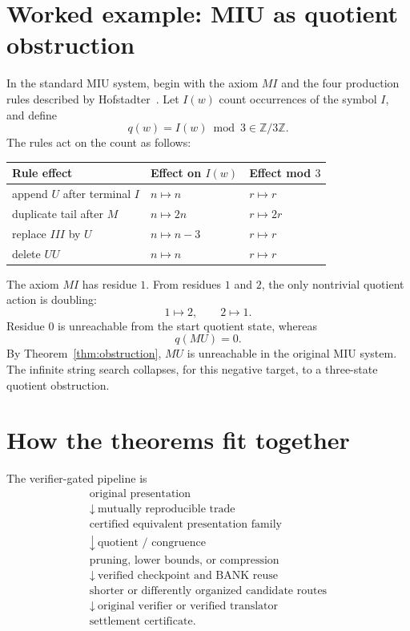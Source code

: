 \documentclass[11pt]{article}
\theoremstyle{definition}
\theoremstyle{remark}
\begin{document}
\section{Worked example: MIU as quotient obstruction}
In the standard MIU system, begin with the axiom $MI$ and the four production rules described by Hofstadter~\cite{Hofstadter1979}. Let $I(w)$ count occurrences of the symbol $I$, and define
\[
q(w)=I(w)\bmod 3\in\mathbb Z/3\mathbb Z.
\]
The rules act on the count as follows:
\begin{center}
\begin{tabular}{lll}
\toprule
Rule effect & Effect on $I(w)$ & Effect mod $3$\\
\midrule
append $U$ after terminal $I$ & $n\mapsto n$ & $r\mapsto r$\\
duplicate tail after $M$ & $n\mapsto 2n$ & $r\mapsto 2r$\\
replace $III$ by $U$ & $n\mapsto n-3$ & $r\mapsto r$\\
delete $UU$ & $n\mapsto n$ & $r\mapsto r$\\
\bottomrule
\end{tabular}
\end{center}
The axiom $MI$ has residue $1$. From residues $1$ and $2$, the only nontrivial quotient action is doubling:
\[
1\mapsto2,\qquad 2\mapsto1.
\]
Residue $0$ is unreachable from the start quotient state, whereas
\[
q(MU)=0.
\]
By Theorem~\ref{thm:obstruction}, $MU$ is unreachable in the original MIU system. The infinite string search collapses, for this negative target, to a three-state quotient obstruction.

\section{How the theorems fit together}
The verifier-gated pipeline is
\[
\begin{array}{c}
\text{original presentation}\\
\downarrow\ \text{mutually reproducible trade}\\
\text{certified equivalent presentation family}\\
\downarrow\ \text{quotient / congruence}\\
\text{pruning, lower bounds, or compression}\\
\downarrow\ \text{verified checkpoint and BANK reuse}\\
\text{shorter or differently organized candidate routes}\\
\downarrow\ \text{original verifier or verified translator}\\
\text{settlement certificate.}
\end{array}
\]
\end{document}
